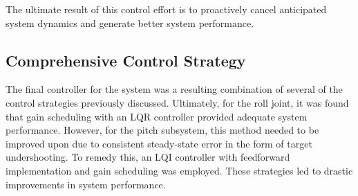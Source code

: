 The ultimate result of this control effort is to proactively cancel anticipated system dynamics and generate better system performance.

\subsection{Comprehensive Control Strategy}


The final controller for the system was a resulting combination of several of the control strategies previously discussed. Ultimately, for the roll joint, it was found that gain scheduling with an LQR controller provided adequate system performance. However, for the pitch subsystem, this method needed to be improved upon due to consistent steady-state error in the form of target undershooting. To remedy this, an LQI controller with feedforward implementation and gain scheduling was employed. These strategies led to drastic improvements in system performance.
